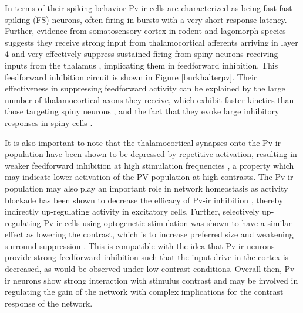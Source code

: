 In terms of their spiking behavior Pv-ir cells are characterized as
being fast fast-spiking (FS) neurons, often firing in bursts with a
very short response latency. Further, evidence from somatosensory
cortex in rodent and lagomorph species suggests they receive strong
input from thalamocortical afferents arriving in layer 4 and very
effectively suppress sustained firing from spiny neurons receiving
inputs from the thalamus \citep{Swadlow2003}, implicating them in
feedforward inhibition. This feedforward inhibition circuit is shown
in Figure \ref{burkhalterpv}. Their effectiveness in suppressing
feedforward activity can be explained by the large number of
thalamocortical axons they receive, which exhibit faster kinetics than
those targeting spiny neurons \citep{Cruikshank2007,Gabernet2005}, and
the fact that they evoke large inhibitory responses in spiny cells
\citep{Cruikshank2007,Gabernet2005}.

It is also important to note that the thalamocortical synapses onto
the Pv-ir population have been shown to be depressed by repetitive
activation, resulting in weaker feedforward inhibition at high
stimulation frequencies \citep{Gabernet2005}, a property which may
indicate lower activation of the PV population at high contrasts. The
Pv-ir population may also play an important role in network
homeostasis as activity blockade has been shown to decrease the
efficacy of Pv-ir inhibition \citep{Bartley2008}, thereby indirectly
up-regulating activity in excitatory cells. Further, selectively
up-regulating Pv-ir cells using optogenetic stimulation was shown to
have a similar effect as lowering the contrast, which is to increase
preferred size and weakening surround suppression
\citep{Nienborg2013}. This is compatible with the idea that Pv-ir
neurons provide strong feedforward inhibition such that the input
drive in the cortex is decreased, as would be observed under low
contrast conditions. Overall then, Pv-ir neurons show strong
interaction with stimulus contrast and may be involved in regulating
the gain of the network with complex implications for the contrast
response of the network.

